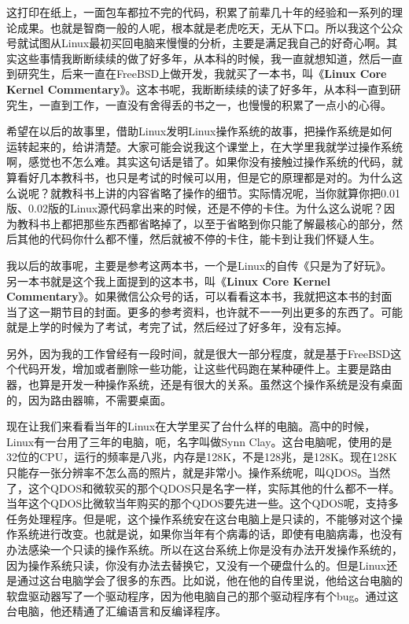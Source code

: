 \documentclass[
  letterpaper,
  DIV=11,
  numbers=noendperiod]{scrreprt}
\begin{document}
这打印在纸上，一面包车都拉不完的代码，积累了前辈几十年的经验和一系列的理论成果。也就是智商一般的人呢，根本就是老虎吃天，无从下口。所以我这个公众号就试图从Linux最初买回电脑来慢慢的分析，主要是满足我自己的好奇心啊。其实这些事情我断断续续的做了好多年，从本科的时候，我一直就想知道，然后一直到研究生，后来一直在FreeBSD上做开发，我就买了一本书，叫《\textbf{Linux
Core Kernel
Commentary}》。这本书呢，我断断续续的读了好多年，从本科一直到研究生，一直到工作，一直没有舍得丢的书之一，也慢慢的积累了一点小的心得。

希望在以后的故事里，借助Linux发明Linux操作系统的故事，把操作系统是如何运转起来的，给讲清楚。大家可能会说我这个课堂上，在大学里我就学过操作系统啊，感觉也不怎么难。其实这句话是错了。如果你没有接触过操作系统的代码，就算看好几本教科书，也只是考试的时候可以用，但是它的原理都是对的。为什么这么说呢？就教科书上讲的内容省略了操作的细节。实际情况呢，当你就算你把0.01版、0.02版的Linux源代码拿出来的时候，还是不停的卡住。为什么这么说呢？因为教科书上都把那些东西都省略掉了，以至于省略到你只能了解最核心的部分，然后其他的代码你什么都不懂，然后就被不停的卡住，能卡到让我们怀疑人生。

我以后的故事呢，主要是参考这两本书，一个是Linux的自传《只是为了好玩》。另一本书就是这个我上面提到的这本书，叫《\textbf{Linux
Core Kernel
Commentary}》。如果微信公众号的话，可以看看这本书，我就把这本书的封面当了这一期节目的封面。更多的参考资料，也许就不一一列出更多的东西了。可能就是上学的时候为了考试，考完了试，然后经过了好多年，没有忘掉。

另外，因为我的工作曾经有一段时间，就是很大一部分程度，就是基于FreeBSD这个代码开发，增加或者删除一些功能，让这些代码跑在某种硬件上。主要是路由器，也算是开发一种操作系统，还是有很大的关系。虽然这个操作系统是没有桌面的，因为路由器嘛，不需要桌面。

现在让我们来看看当年的Linux在大学里买了台什么样的电脑。高中的时候，Linux有一台用了三年的电脑，呃，名字叫做Synn
Clay。这台电脑呢，使用的是32位的CPU，运行的频率是八兆，内存是128K，不是128兆，是128K。现在128K只能存一张分辨率不怎么高的照片，就是非常小。操作系统呢，叫QDOS。当然了，这个QDOS和微软买的那个QDOS只是名字一样，实际其他的什么都不一样。当年这个QDOS比微软当年购买的那个QDOS要先进一些。这个QDOS呢，支持多任务处理程序。但是呢，这个操作系统安在这台电脑上是只读的，不能够对这个操作系统进行改变。也就是说，如果你当年有个病毒的话，即使有电脑病毒，也没有办法感染一个只读的操作系统。所以在这台系统上你是没有办法开发操作系统的，因为操作系统只读，你没有办法去替换它，又没有一个硬盘什么的。但是Linux还是通过这台电脑学会了很多的东西。比如说，他在他的自传里说，他给这台电脑的软盘驱动器写了一个驱动程序，因为他电脑自己的那个驱动程序有个bug。通过这台电脑，他还精通了汇编语言和反编译程序。
\end{document}
